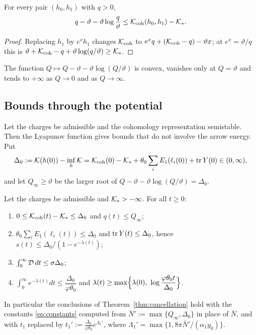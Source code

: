 \begin{lemma}\label{lem:qbound}
For every pair $(h_0,h_1)$ with $q>0$,
\[
 q-\vartheta-\vartheta\log\frac q\vartheta\leq\mathcal K_{\mathrm{coh}}(h_0,h_1)-\mathcal K_* .
\]
\end{lemma}

\begin{proof}
Replacing $h_1$ by $e^xh_1$ changes $\mathcal K_{\mathrm{coh}}$ to
$e^xq+(\mathcal K_{\mathrm{coh}}-q)-\vartheta x$; at $e^x=\vartheta/q$ this is
$\vartheta+\mathcal K_{\mathrm{coh}}-q+\vartheta\log(q/\vartheta)\geq\mathcal K_*$.
\end{proof}

The function $Q\mapsto Q-\vartheta-\vartheta\log(Q/\vartheta)$ is convex,
vanishes only at $Q=\vartheta$ and tends to $+\infty$ as $Q\to0$ and as
$Q\to\infty$.

\subsection{Bounds through the potential}
Let the charges be admissible and the cohomology representation semistable.
Then the Lyapunov function gives bounds that do not involve the arrow energy.
Put
\begin{equation}\label{eq:gap}
 \Delta_0:=\mathcal K(h(0))-\inf_h\mathcal K
 =\mathcal K_{\mathrm{coh}}(0)-\mathcal K_*+\theta_0\sum_iE_1(\ell_i(0))+\operatorname{tr} Y(0)\in(0,\infty),
\end{equation}
and let $Q_\infty\geq\vartheta$ be the larger root of
$Q-\vartheta-\vartheta\log(Q/\vartheta)=\Delta_0$.

\begin{proposition}\label{prop:apriori}
Let the charges be admissible and $\mathcal K_*>-\infty$. For all $t\geq0$:
\begin{enumerate}
\item[(i)] $0\leq\mathcal K_{\mathrm{coh}}(t)-\mathcal K_*\leq\Delta_0$ and $q(t)\leq Q_\infty$;
\item[(ii)] $\theta_0\sum_iE_1(\ell_i(t))\leq\Delta_0$ and
 $\operatorname{tr} Y(t)\leq\Delta_0$, hence $s(t)\leq\Delta_0/(1-e^{-\lambda(t)})$;
\item[(iii)] $\int_0^\infty\mathcal D\,dt\leq\sigma\Delta_0$;
\item[(iv)] $\int_0^\infty e^{-\lambda(t)}dt\leq\dfrac{\Delta_0}{\varphi\theta_0}$
 and
 $\lambda(t)\geq\max\Bigl\{\lambda(0),\ \log\dfrac{\varphi\theta_0t}{\Delta_0}\Bigr\}$.
\end{enumerate}
In particular the conclusions of Theorem~\ref{thm:cancellation} hold with the
constants \eqref{eq:constants} computed from
$\bar N':=\max\{Q_\infty,\Delta_0\}$ in place of $\bar N$, and with $t_1$
replaced by $t_1':=\frac{\Delta_0}{\varphi\theta_0}e^{\Lambda_1'}$, where
$\Lambda_1'=\max\{1,8\pi\bar N'/(\alpha_1y_0)\}$.
\end{proposition}

